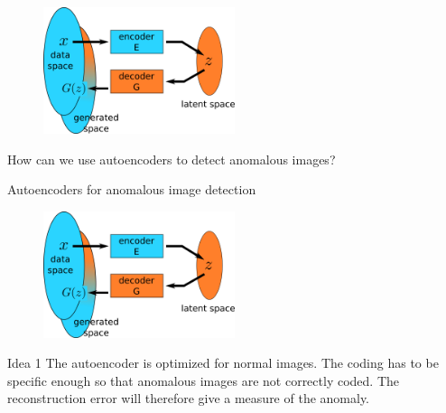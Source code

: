 \documentclass[xcolor=pdftex,dvipsnames,table,mathserif]{beamer}
\begin{document}
\begin{frame}{}

  \begin{figure}[ht]
    \centering
    \includegraphics[width=0.5\textwidth]{ae.png}
  \end{figure}

  \begin{alertblock}{}
  How can we use autoencoders to detect anomalous images?
\end{alertblock}

\end{frame}


\begin{frame}{Autoencoders for anomalous image detection}

  \begin{figure}[ht]
    \centering
    \includegraphics[width=0.5\textwidth]{ae.png}
  \end{figure}

  \begin{block}{Idea 1}
    The autoencoder is optimized for normal images. The coding has to be specific enough so that anomalous images are not correctly coded. The reconstruction error will therefore give a measure of the anomaly.
  \end{block}

\end{frame}
\end{document}
